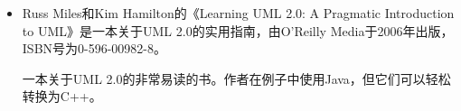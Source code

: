 \begin{itemize}
\item
Russ Miles和Kim Hamilton的《Learning UML 2.0: A Pragmatic Introduction to UML》是一本关于UML 2.0的实用指南，由O’Reilly Media于2006年出版，ISBN号为0-596-00982-8。

\hspace*{\fill}

一本关于UML 2.0的非常易读的书。作者在例子中使用Java，但它们可以轻松转换为C++。
\end{itemize}